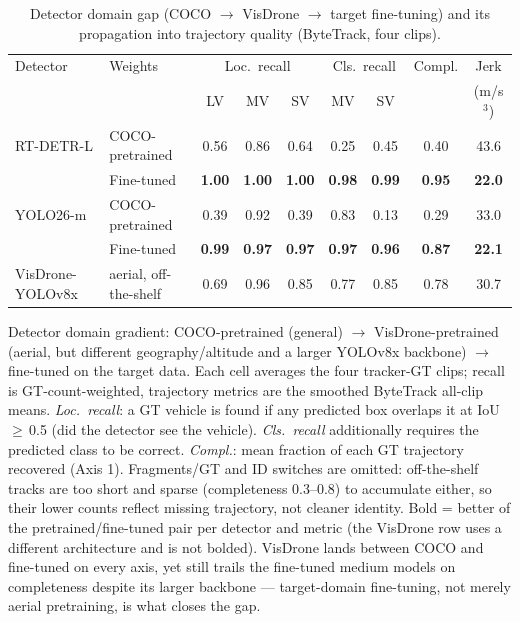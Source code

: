 \begin{table}[ht]
  \centering
  \caption{Detector domain gap (COCO $\to$ VisDrone $\to$ target fine-tuning) and its propagation into trajectory quality (ByteTrack, four clips).}
  \label{tab:ablation}
  \begin{tabular}{llccccccc}
    \toprule
    Detector & Weights & \multicolumn{3}{c}{Loc.\ recall} & \multicolumn{2}{c}{Cls.\ recall} & Compl. & Jerk \\
    & & LV & MV & SV & MV & SV & & (m/s$^3$) \\
    \midrule
    RT-DETR-L & COCO-pretrained & 0.56 & 0.86 & 0.64 & 0.25 & 0.45 & 0.40 & 43.6 \\
     & Fine-tuned & \textbf{1.00} & \textbf{1.00} & \textbf{1.00} & \textbf{0.98} & \textbf{0.99} & \textbf{0.95} & \textbf{22.0} \\
    \addlinespace
    YOLO26-m & COCO-pretrained & 0.39 & 0.92 & 0.39 & 0.83 & 0.13 & 0.29 & 33.0 \\
     & Fine-tuned & \textbf{0.99} & \textbf{0.97} & \textbf{0.97} & \textbf{0.97} & \textbf{0.96} & \textbf{0.87} & \textbf{22.1} \\
    \addlinespace
    VisDrone-YOLOv8x & aerial, off-the-shelf & 0.69 & 0.96 & 0.85 & 0.77 & 0.85 & 0.78 & 30.7 \\
    \bottomrule
  \end{tabular}
  \par\smallskip
  \footnotesize Detector domain gradient: COCO-pretrained (general) $\to$ VisDrone-pretrained (aerial, but different geography/altitude and a larger YOLOv8x backbone) $\to$ fine-tuned on the target data. Each cell averages the four tracker-GT clips; recall is GT-count-weighted, trajectory metrics are the smoothed ByteTrack all-clip means. \emph{Loc.\ recall}: a GT vehicle is found if any predicted box overlaps it at IoU\,$\geq$\,0.5 (did the detector see the vehicle). \emph{Cls.\ recall} additionally requires the predicted class to be correct. \emph{Compl.}: mean fraction of each GT trajectory recovered (Axis 1). Fragments/GT and ID switches are omitted: off-the-shelf tracks are too short and sparse (completeness 0.3--0.8) to accumulate either, so their lower counts reflect missing trajectory, not cleaner identity. Bold = better of the pretrained/fine-tuned pair per detector and metric (the VisDrone row uses a different architecture and is not bolded). VisDrone lands between COCO and fine-tuned on every axis, yet still trails the fine-tuned medium models on completeness despite its larger backbone --- target-domain fine-tuning, not merely aerial pretraining, is what closes the gap.
\end{table}
